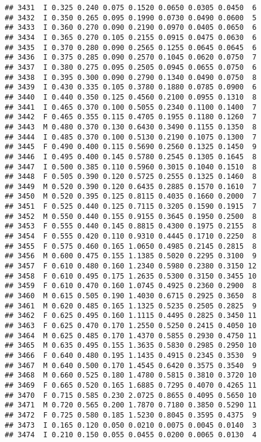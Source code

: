 \documentclass[
]{article}
\begin{document}
\begin{verbatim}
## 3431  I 0.325 0.240 0.075 0.1520 0.0650 0.0305 0.0450  6
## 3432  I 0.350 0.265 0.095 0.1990 0.0730 0.0490 0.0600  5
## 3433  I 0.360 0.270 0.090 0.2190 0.0970 0.0405 0.0650  6
## 3434  I 0.365 0.270 0.105 0.2155 0.0915 0.0475 0.0630  6
## 3435  I 0.370 0.280 0.090 0.2565 0.1255 0.0645 0.0645  6
## 3436  I 0.375 0.285 0.090 0.2570 0.1045 0.0620 0.0750  7
## 3437  I 0.380 0.275 0.095 0.2505 0.0945 0.0655 0.0750  6
## 3438  I 0.395 0.300 0.090 0.2790 0.1340 0.0490 0.0750  8
## 3439  I 0.430 0.335 0.105 0.3780 0.1880 0.0785 0.0900  6
## 3440  I 0.440 0.350 0.125 0.4560 0.2100 0.0955 0.1310  8
## 3441  I 0.465 0.370 0.100 0.5055 0.2340 0.1100 0.1400  7
## 3442  F 0.465 0.355 0.115 0.4705 0.1955 0.1180 0.1260  7
## 3443  M 0.480 0.370 0.130 0.6430 0.3490 0.1155 0.1350  8
## 3444  I 0.485 0.370 0.100 0.5130 0.2190 0.1075 0.1300  7
## 3445  F 0.490 0.400 0.115 0.5690 0.2560 0.1325 0.1450  9
## 3446  I 0.495 0.400 0.145 0.5780 0.2545 0.1305 0.1645  8
## 3447  I 0.500 0.385 0.110 0.5960 0.3015 0.1040 0.1510  8
## 3448  F 0.505 0.390 0.120 0.5725 0.2555 0.1325 0.1460  8
## 3449  M 0.520 0.390 0.120 0.6435 0.2885 0.1570 0.1610  7
## 3450  M 0.520 0.395 0.125 0.8115 0.4035 0.1660 0.2000  7
## 3451  F 0.525 0.440 0.125 0.7115 0.3205 0.1590 0.1915  7
## 3452  M 0.550 0.440 0.155 0.9155 0.3645 0.1950 0.2500  8
## 3453  F 0.555 0.440 0.145 0.8815 0.4300 0.1975 0.2155  8
## 3454  F 0.555 0.420 0.110 0.9310 0.4445 0.1710 0.2250  8
## 3455  F 0.575 0.460 0.165 1.0650 0.4985 0.2145 0.2815  8
## 3456  M 0.600 0.475 0.155 1.1385 0.5020 0.2295 0.3100  9
## 3457  F 0.610 0.480 0.160 1.2340 0.5980 0.2380 0.3150 12
## 3458  F 0.610 0.495 0.175 1.2635 0.5300 0.3150 0.3455 10
## 3459  F 0.610 0.470 0.160 1.0745 0.4925 0.2360 0.2900  8
## 3460  M 0.615 0.505 0.190 1.4030 0.6715 0.2925 0.3650  8
## 3461  M 0.620 0.485 0.165 1.1325 0.5235 0.2505 0.2825  9
## 3462  F 0.625 0.495 0.160 1.1115 0.4495 0.2825 0.3450 11
## 3463  F 0.625 0.470 0.170 1.2550 0.5250 0.2415 0.4050 10
## 3464  M 0.625 0.485 0.170 1.4370 0.5855 0.2930 0.4750 11
## 3465  M 0.635 0.495 0.155 1.3635 0.5830 0.2985 0.2950 10
## 3466  F 0.640 0.480 0.195 1.1435 0.4915 0.2345 0.3530  9
## 3467  M 0.640 0.500 0.170 1.4545 0.6420 0.3575 0.3540  9
## 3468  M 0.660 0.525 0.180 1.4780 0.5815 0.3810 0.3720 10
## 3469  F 0.665 0.520 0.165 1.6885 0.7295 0.4070 0.4265 11
## 3470  F 0.715 0.585 0.230 2.0725 0.8655 0.4095 0.5650 10
## 3471  M 0.720 0.565 0.200 1.7870 0.7180 0.3850 0.5290 11
## 3472  F 0.725 0.580 0.185 1.5230 0.8045 0.3595 0.4375  9
## 3473  I 0.165 0.120 0.050 0.0210 0.0075 0.0045 0.0140  3
## 3474  I 0.210 0.150 0.055 0.0455 0.0200 0.0065 0.0130  4

\end{verbatim}
\end{document}
